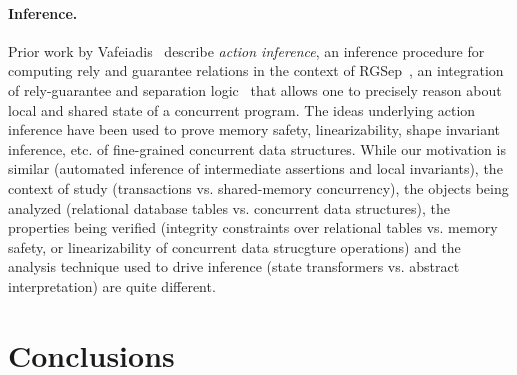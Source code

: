 
\vspace*{-4pt}
\paragraph{Inference.}  Prior work by Vafeiadis~\cite{Vaf10,Vaf10a}
describe \emph{action inference}, an inference procedure for computing
rely and guarantee relations in the context of RGSep~\cite{VP07}, an
integration of rely-guarantee and separation logic~\cite{Rey02} that
allows one to precisely reason about local and shared state of a
concurrent program. The ideas underlying action inference have been
used to prove memory safety, linearizability, shape invariant
inference, etc.  of fine-grained concurrent data structures.  While
our motivation is similar (automated inference of intermediate
assertions and local invariants), the context of study (transactions
vs. shared-memory concurrency), the objects being analyzed (relational
database tables vs. concurrent data structures), the properties being
verified (integrity constraints over relational tables vs. memory
safety, or linearizability of concurrent data strucgture operations)
and the analysis technique used to drive inference (state transformers
vs. abstract interpretation) are quite different.

\section{Conclusions}
\label{sec:conclusions}

